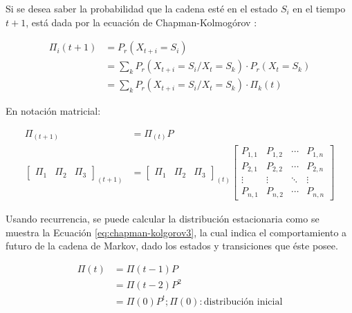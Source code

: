 Si se desea saber la probabilidad que la cadena esté en el estado $S_i$ en el tiempo $t+1$, está dada por la ecuación de Chapman-Kolmogórov \citep{Papoulis1984}:

\begin{equation} \label{eq:chapman-kolmogorov1}
\begin{split}
	\Pi_{i} (t+1) &= P_r(X_{t+i}=S_i) \\
				  &= \sum _{k} P_r(X_{t+i} = S_i / X_t = S_k)·P_r(X_t = S_k)\\
				  &= \sum _{k} P_r(X_{t+i} = S_i / X_t = S_k)·\Pi_{k} (t)
\end{split}	
\end{equation}

En notación matricial:

\begin{equation} \label{eq:chapman-kolgorov2}
\begin{split}
	\Pi_{(t+1)} &= \Pi_{(t)}P\\
	\begin{bmatrix}
		\Pi_1 & \Pi_2 & \Pi_3
	\end{bmatrix} _{(t+1)}
	&= \begin{bmatrix}
		\Pi_1 & \Pi_2 & \Pi_3
	\end{bmatrix} _{(t)}
	\begin{bmatrix}
		P_{1,1} & P_{1,2} & \cdots & P_{1,n} \\
		P_{2,1} & P_{2,2} & \cdots & P_{2,n} \\
		\vdots  & \vdots  & \ddots & \vdots  \\
		P_{n,1} & P_{n,2} & \cdots & P_{n,n}
	\end{bmatrix}
\end{split}
\end{equation}

Usando recurrencia, se puede calcular la distribución estacionaria como se muestra la Ecuación \ref{eq:chapman-kolgorov3}, la cual indica el comportamiento a futuro de la cadena de Markov, dado los estados y transiciones que éste posee.

\begin{equation} \label{eq:chapman-kolgorov3}
\begin{split}
	\Pi (t) &= \Pi (t-1)P \\
				  &= \Pi (t-2)P^{2}\\
				  &= \Pi (0)P^{t} ; \Pi (0): \text{distribución inicial}
\end{split}
\end{equation}

